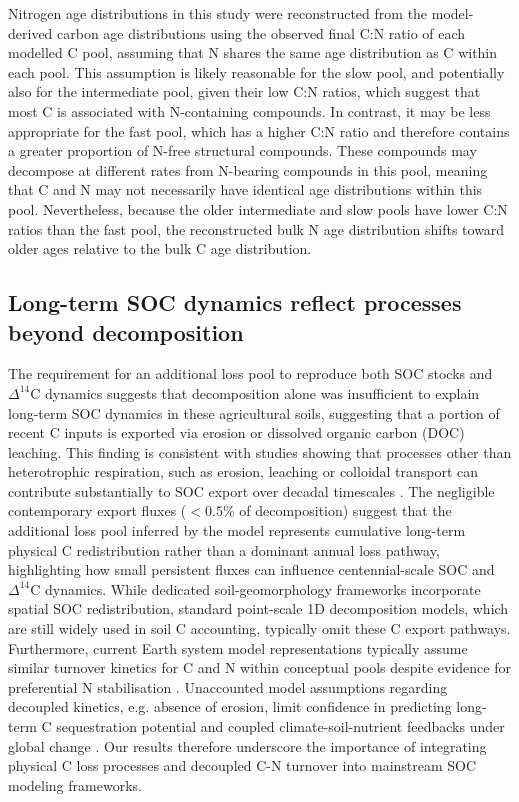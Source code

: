 \documentclass[bg, manuscript]{copernicus}
\begin{document}
Nitrogen age distributions in this study were reconstructed from the model-derived carbon age distributions using the observed final C:N ratio of each modelled C pool, assuming that N shares the same age distribution as C within each pool. This assumption is likely reasonable for the slow pool, and potentially also for the intermediate pool, given their low C:N ratios, which suggest that most C is associated with N-containing compounds. In contrast, it may be less appropriate for the fast pool, which has a higher C:N ratio and therefore contains a greater proportion of N-free structural compounds. These compounds may decompose at different rates from N-bearing compounds in this pool, meaning that C and N may not necessarily have identical age distributions within this pool. Nevertheless, because the older intermediate and slow pools have lower C:N ratios than the fast pool, the reconstructed bulk N age distribution shifts toward older ages relative to the bulk C age distribution.

\subsection{Long-term SOC dynamics reflect processes beyond decomposition}
The requirement for an additional loss pool to reproduce both SOC stocks and $\Delta^{14}\text{C}$ dynamics suggests that decomposition alone was insufficient to explain long-term SOC dynamics in these agricultural soils, suggesting that a portion of recent C inputs is exported via erosion or dissolved organic carbon (DOC) leaching. This finding is consistent with studies showing that processes other than heterotrophic respiration, such as erosion, leaching or colloidal transport can contribute substantially to SOC export over decadal timescales \citep{Berhe2012, Doetterl2016, Quinton2010}. The negligible contemporary export fluxes ($< 0.5\%$ of decomposition) suggest that the additional loss pool inferred by the model represents cumulative long-term physical C redistribution rather than a dominant annual loss pathway, highlighting how small persistent fluxes can influence centennial-scale SOC and $\Delta^{14}\text{C}$ dynamics. While dedicated soil-geomorphology frameworks incorporate spatial SOC redistribution, standard point-scale 1D decomposition models, which are still widely used in soil C accounting, typically omit these C export pathways. Furthermore, current Earth system model representations typically assume similar turnover kinetics for C and N within conceptual pools despite evidence for preferential N stabilisation \citep{Spohn2024, Koven2013}. Unaccounted model assumptions regarding decoupled kinetics, e.g. absence of erosion, limit confidence in predicting long-term C sequestration potential and coupled climate-soil-nutrient feedbacks under global change \citep{Luo2006, Yu2024, Gonzlez-Sosa2024}. Our results therefore underscore the importance of integrating physical C loss processes and decoupled C-N turnover into mainstream SOC modeling frameworks.
\end{document}
